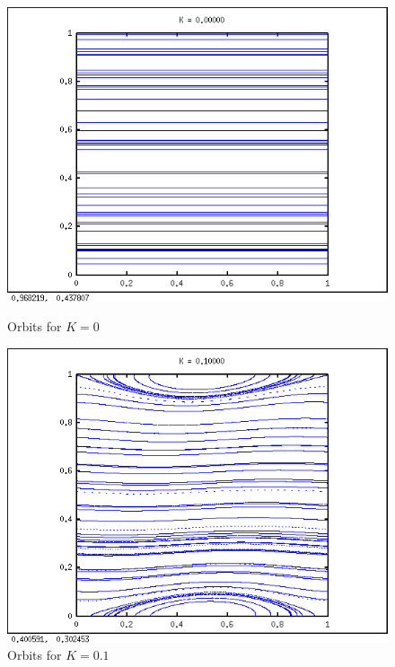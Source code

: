 \documentclass[a4paper,11pt]{article}
\begin{document}
\begin{figure}[H]
\centering
\begin{minipage}{0.5\textwidth}
\centering
\includegraphics[width=\textwidth]{k0.png}
\caption{Orbits for $K = 0$}
\end{minipage}\hfill
\begin{minipage}{0.5\textwidth}
\centering
\includegraphics[width=\textwidth]{k01.png}
\caption{Orbits for $K = 0.1$}
\end{minipage}
\end{figure}
\end{document}
